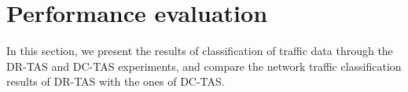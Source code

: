 \documentclass[10pt, twoside, jounal]{IEEEtran}
\begin{document}
\section{Performance evaluation}
In this section, we present the results of classification of traffic data through the DR-TAS and DC-TAS experiments, and compare the network traffic classification results of DR-TAS with the ones of DC-TAS.
\end{document}
